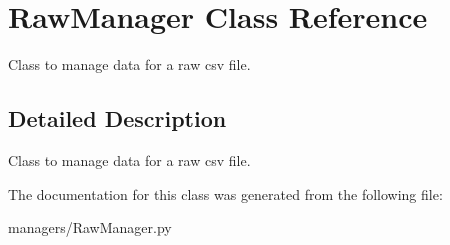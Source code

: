 \hypertarget{class_raw_manager}{}\section{Raw\+Manager Class Reference}
\label{class_raw_manager}


Class to manage data for a raw csv file.  




\subsection{Detailed Description}
Class to manage data for a raw csv file. 



The documentation for this class was generated from the following file\+:\begin{DoxyCompactItemize}
\item 
managers/Raw\+Manager.\+py\end{DoxyCompactItemize}
